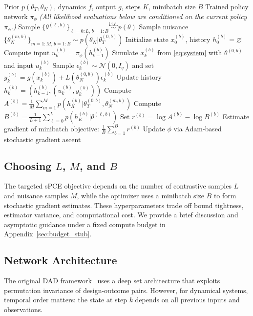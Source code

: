 \documentclass[conference]{IEEEtran}
\begin{document}
\begin{algorithm}[t]
\caption{Targeted Deep Adaptive Design for MBDOE}
\label{algo:DAD}
\begin{algorithmic}[1]
\REQUIRE Prior $p(\theta_T, \theta_N)$, dynamics $f$, output $g$, steps $K$, minibatch size $B$
\ENSURE Trained policy network $\pi_\phi$
    \STATE \textit{(All likelihood evaluations below are conditioned on the current policy $\pi_\phi$.)}
    \STATE Sample $\{\theta^{(\ell,b)}\}_{\ell=0:L,\,b=1:B} \overset{\text{i.i.d.}}{\sim} p(\theta)$
    \STATE Sample nuisance $\{\theta_N^{(m,b)}\}_{m=1:M,\,b=1:B} \sim p(\theta_N|\theta_T^{(0,b)})$
        \STATE Initialize state $x_0^{(b)}$, history $h_0^{(b)} = \varnothing$
            \STATE Compute input $u_k^{(b)} = \pi_\phi(h_{k-1}^{(b)})$
            \STATE Simulate $x_k^{(b)}$ from \eqref{eq:system} with $\theta^{(0,b)}$ and input $u_k^{(b)}$
            \STATE Sample $\epsilon_k^{(b)} \sim \mathcal{N}(0, I_q)$ and set $y_k^{(b)} = g(x_k^{(b)}) + L(\theta_N^{(0,b)})\epsilon_k^{(b)}$
            \STATE Update history $h_k^{(b)} = (h_{k-1}^{(b)}, (u_k^{(b)}, y_k^{(b)}))$
        \ENDFOR
        \STATE Compute $A^{(b)} = \frac{1}{M}\sum_{m=1}^{M} p(h_K^{(b)}|\theta_T^{(0,b)}, \theta_N^{(m,b)})$
        \STATE Compute $B^{(b)} = \frac{1}{L+1}\sum_{\ell=0}^{L} p(h_K^{(b)}|\theta^{(\ell,b)})$
        \STATE Set $r^{(b)} = \log A^{(b)} - \log B^{(b)}$
    \ENDFOR
    \STATE Estimate gradient of minibatch objective: $\frac{1}{B}\sum_{b=1}^{B} r^{(b)}$
    \STATE Update $\phi$ via Adam-based stochastic gradient ascent
\ENDWHILE
\end{algorithmic}
\end{algorithm}

\subsection{Choosing $L$, $M$, and $B$}
The targeted sPCE objective depends on the number of contrastive samples $L$ and nuisance samples $M$, while the optimizer uses a minibatch size $B$ to form stochastic gradient estimates.
These hyperparameters trade off bound tightness, estimator variance, and computational cost.
We provide a brief discussion and asymptotic guidance under a fixed compute budget in Appendix~\ref{sec:budget_stub}.

\subsection{Network Architecture}
The original DAD framework~\citep{foster2021} uses a deep set architecture that exploits permutation invariance of design-outcome pairs. However, for dynamical systems, temporal order matters: the state at step $k$ depends on all previous inputs and observations.
\end{document}
